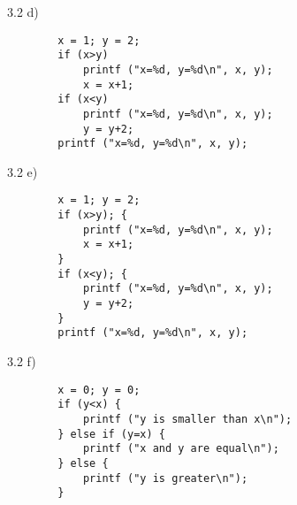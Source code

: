 \documentclass{beamer}
\begin{document}
\begin{frame}[fragile]{3.2 d)}
    \begin{verbatim}
        x = 1; y = 2;
        if (x>y)
            printf ("x=%d, y=%d\n", x, y);
            x = x+1;
        if (x<y)
            printf ("x=%d, y=%d\n", x, y);
            y = y+2;
        printf ("x=%d, y=%d\n", x, y);
    \end{verbatim}
\end{frame}

\begin{frame}[fragile]{3.2 e)}
    \begin{verbatim}
        x = 1; y = 2;
        if (x>y); {
            printf ("x=%d, y=%d\n", x, y);
            x = x+1;
        }
        if (x<y); {
            printf ("x=%d, y=%d\n", x, y);
            y = y+2;
        }
        printf ("x=%d, y=%d\n", x, y);
    \end{verbatim}
\end{frame}

\begin{frame}[fragile]{3.2 f)}
    \begin{verbatim}
        x = 0; y = 0;
        if (y<x) {
            printf ("y is smaller than x\n");
        } else if (y=x) {
            printf ("x and y are equal\n");
        } else {
            printf ("y is greater\n");
        }
    \end{verbatim}
\end{frame}

%
%
%
%
% 
\end{document}
